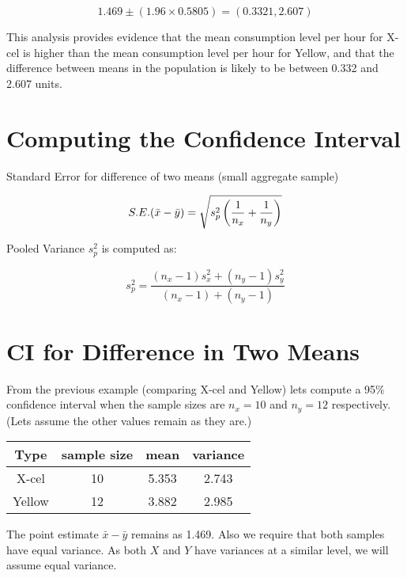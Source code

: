 \documentclass[]{report}
\begin{document}
	\[ 1.469  \pm (1.96 \times 0.5805) = (0.3321,2.607) \]
	
	
	This analysis provides evidence that the mean consumption level per hour for X-cel is higher than the mean consumption level per hour for Yellow, and that the difference between means in the population is likely to be between 0.332 and 2.607 units.
	
	
	
	
	\section{Computing the Confidence Interval}
	Standard Error for difference of two means (small aggregate sample)
	
	\[ S.E.(\bar{x}-\bar{y}) = \sqrt{  s^2_p \left({1\over n_x}+{1\over n_y} \right)} \]
	
	Pooled Variance $s^2_p$ is computed as:
	
	\[ s^2_p = \frac{(n_x-1)s^2_x + (n_y-1)s^2_y}{(n_x-1) + (n_y-1)} \]
	
	
	\section{CI for Difference in Two Means}
	From the previous example (comparing X-cel and Yellow) lets compute a 95\% confidence interval when the sample sizes are $n_x=10$ and $n_y=12$ respectively. (Lets assume the other values remain as they are.)
	\begin{center}
		\begin{tabular}{|c|c|c|c|}
			\hline
			Type & sample size & mean & variance \\ \hline
			X-cel & 10 & 5.353 & 2.743 \\ \hline
			Yellow & 12 & 3.882 & 2.985 \\ \hline
		\end{tabular}
	\end{center}
	The point estimate $\bar{x} - \bar{y}$ remains as 1.469. Also we require that both samples have equal variance. As both $X$ and $Y$ have variances at a similar level, we will assume equal variance.
	
	
	
	
\end{document}
